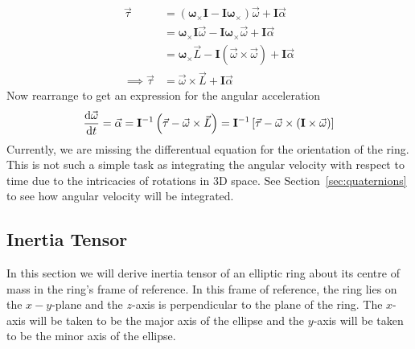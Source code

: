 \begin{align}
    \vec{\tau}          & = \left({\mathbf{\omega}}_{\times} \mathbf{I} - \mathbf{I}{\mathbf{\omega}}_{\times}\right) \vec{\omega}
    + \mathbf{I} \vec{\alpha} \nonumber                                                                                            \\
                        & = {\mathbf{\omega}}_{\times} \mathbf{I} \vec{\omega} - \mathbf{I}{\mathbf{\omega}}_{\times} \vec{\omega}
    + \mathbf{I} \vec{\alpha} \nonumber                                                                                            \\
                        & = {\mathbf{\omega}}_{\times} \vec{L} - \mathbf{I}\left(\vec{\omega} \times \vec{\omega}\right)
    + \mathbf{I} \vec{\alpha} \nonumber                                                                                            \\
    \implies \vec{\tau} & = \vec{\omega} \times \vec{L} + \mathbf{I} \vec{\alpha}
\end{align}
Now rearrange to get an expression for the angular acceleration
\begin{equation}
    \frac{\textrm{d}\vec{\omega}}{\textrm{d} t} = \vec{\alpha}
    = {\mathbf{I}}^{-1} \left(\vec{\tau} - \vec{\omega} \times \vec{L}\right)
        = {\mathbf{I}}^{-1} \left[\vec{\tau} - \vec{\omega} \times \left(\mathbf{I} \times \vec{\omega}\right)\right]
\end{equation}
Currently, we are missing the differentual equation for the orientation of the ring. This is not such a simple task as
integrating the angular velocity with respect to time due to the intricacies of rotations in 3D space. See
Section~\ref{sec:quaternions} to see how angular velocity will be integrated.

\subsection{Inertia Tensor}
In this section we will derive inertia tensor of an elliptic ring about its centre of mass in the ring's frame of reference.
In this frame of reference, the ring lies on the \( x-y \)-plane and the \( z \)-axis is perpendicular to the plane of the ring.
The \( x \)-axis will be taken to be the major axis of the ellipse and the \( y \)-axis will be taken to be the minor axis of the
ellipse.

